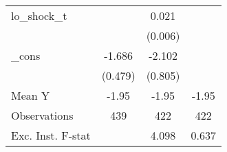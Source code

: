 {\begin{tabular}{l*{3}{c}}
\addlinespace
lo\_shock\_t  &                     &       0.021\sym{***}&                     \\
            &                     &     (0.006)         &                     \\
\addlinespace
\_cons      &      -1.686\sym{***}&      -2.102\sym{**} &                     \\
            &     (0.479)         &     (0.805)         &                     \\
\midrule
Mean Y      &       -1.95         &       -1.95         &       -1.95         \\
Observations&         439         &         422         &         422         \\
Exc. Inst. F-stat&                     &       4.098         &       0.637         \\
\bottomrule
\end{tabular}
}
